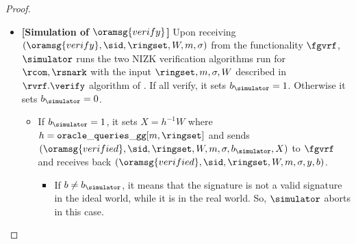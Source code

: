 \begin{proof}
\begin{itemize}
		
		\item \textbf{[Simulation of $ \oramsg{verify} $]} Upon receiving  $(\oramsg{verify}, \sid, \ringset,W, m, \sigma)$ from the functionality $\fgvrf$, $ \simulator $ runs the two NIZK verification algorithms run for $ \rcom, \rsnark $ with the input $ \ringset, m, \sigma, W $ described in $ \rvrf.\verify $ algorithm of \name. If  all verify, it sets $ b_{\simulator} =1 $. Otherwise it sets $ b_{\simulator} =0  $.
		
		\begin{itemize}
			\item 		If $ b_\simulator = 1 $, it sets $ X = h^{-1} W$ where $ h = \mathtt{oracle\_queries\_gg}[m, \ringset] $ and sends  $ (\oramsg{verified}, \sid, \ringset, W, m, \sigma, b_\simulator, X) $ to $ \fgvrf $ and receives back $ (\oramsg{verified}, \sid, \ringset, W, m, \sigma, y, b) $. 
			\begin{itemize}
				\item If $ b \neq b_\simulator $, it means that the signature is not a valid signature in the ideal world, while it is in the real world. So, $ \simulator $ aborts in this case.
				

\end{itemize}
\end{itemize}
\end{itemize}
\end{proof}
